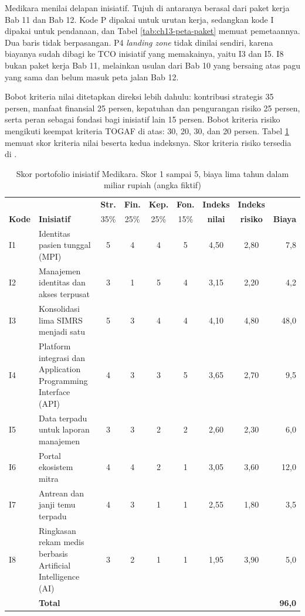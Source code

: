 Medikara menilai delapan inisiatif. Tujuh di antaranya berasal dari paket kerja
Bab 11 dan Bab 12. Kode P dipakai untuk urutan kerja, sedangkan kode I dipakai
untuk pendanaan, dan Tabel \ref{tab:ch13-peta-paket} memuat pemetaannya. Dua
baris tidak berpasangan. P4 \textit{landing zone} tidak dinilai sendiri, karena
biayanya sudah dibagi ke TCO inisiatif yang memakainya, yaitu I3 dan I5. I8 bukan
paket kerja Bab 11, melainkan usulan dari Bab 10 yang bersaing atas pagu yang
sama dan belum masuk peta jalan Bab 12.

Bobot kriteria nilai ditetapkan direksi lebih dahulu: kontribusi strategis 35 persen,
manfaat finansial 25 persen, kepatuhan dan pengurangan risiko 25 persen, serta
peran sebagai fondasi bagi inisiatif lain 15 persen. Bobot kriteria risiko
mengikuti keempat kriteria TOGAF di atas: 30, 20, 30, dan 20 persen. Tabel
\ref{tab:ch13-skor-portofolio} memuat skor kriteria nilai beserta kedua
indeksnya. Skor kriteria risiko tersedia di
.

\begin{table}[!htb]
  \centering
  \caption{Skor portofolio inisiatif Medikara. Skor 1 sampai 5, biaya lima
           tahun dalam miliar rupiah (angka fiktif)}
  \label{tab:ch13-skor-portofolio}
  \footnotesize
  \setlength{\tabcolsep}{4pt}
  \begin{tabularx}{\textwidth}{l>{\raggedright\arraybackslash}Xcccccc r}
    \hline
    & & \textbf{Str.} & \textbf{Fin.} & \textbf{Kep.} & \textbf{Fon.} &
      \textbf{Indeks} & \textbf{Indeks} & \\
    \textbf{Kode} & \textbf{Inisiatif} & 35\% & 25\% & 25\% & 15\% &
      \textbf{nilai} & \textbf{risiko} & \textbf{Biaya} \\
    \hline
    I1 & Identitas pasien tunggal (MPI) & 5 & 4 & 4 & 5 & 4,50 & 2,80 & 7,8 \\
    \hline
    I2 & Manajemen identitas dan akses terpusat & 3 & 1 & 5 & 4 & 3,15 & 2,20 &
      4,2 \\
    \hline
    I3 & Konsolidasi lima SIMRS menjadi satu & 5 & 3 & 4 & 4 & 4,10 & 4,80 &
      48,0 \\
    \hline
    I4 & Platform integrasi dan Application Programming Interface (API) & 4 &
      3 & 3 & 5 & 3,65 & 2,70 & 9,5 \\
    \hline
    I5 & Data terpadu untuk laporan manajemen & 3 & 3 & 2 & 2 & 2,60 & 2,30 &
      6,0 \\
    \hline
    I6 & Portal ekosistem mitra & 4 & 4 & 2 & 1 & 3,05 & 3,60 & 12,0 \\
    \hline
    I7 & Antrean dan janji temu terpadu & 4 & 3 & 1 & 1 & 2,55 & 1,80 & 3,5 \\
    \hline
    I8 & Ringkasan rekam medis berbasis Artificial Intelligence (AI) & 3 & 2 &
      1 & 1 & 1,95 & 3,90 & 5,0 \\
    \hline
    & \textbf{Total} & & & & & & & \textbf{96,0} \\
    \hline
  \end{tabularx}
\end{table}

